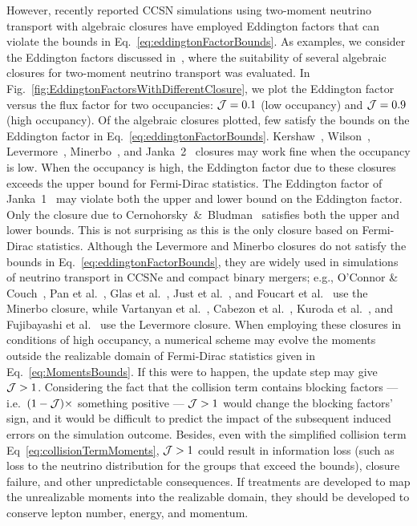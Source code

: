 However, recently reported CCSN simulations using two-moment neutrino transport with algebraic closures have employed Eddington factors that can violate the bounds in Eq.~\eqref{eq:eddingtonFactorBounds}.  
As examples, we consider the Eddington factors discussed in~\cite{murchikova_etal_2017}, where the suitability of several algebraic closures for two-moment neutrino transport was evaluated.  
In Fig.~\ref{fig:EddingtonFactorsWithDifferentClosure}, we plot the Eddington factor versus the flux factor for two occupancies: $\mathcal{J} = 0.1$ (low occupancy) and $\mathcal{J} = 0.9$ (high occupancy).  
Of the algebraic closures plotted, few satisfy the bounds on the Eddington factor in Eq.~\eqref{eq:eddingtonFactorBounds}.  
Kershaw~\cite{kershaw_1976}, Wilson~\cite{wilson_1975,leblancWilson_1970}, Levermore~\cite{levermore_1984}, Minerbo~\cite{minerbo_1978}, and Janka~2~\cite{janka_1992} closures may work fine when the occupancy is low.  
When the occupancy is high, the Eddington factor due to these closures exceeds the upper bound for Fermi-Dirac statistics.  
The Eddington factor of Janka~1~\cite{janka_1991} may violate both the upper and lower bound on the Eddington factor.  
Only the closure due to Cernohorsky~\&~Bludman~\cite{cernohorskyBludman_1994} satisfies both the upper and lower bounds.  
This is not surprising as this is the only closure based on Fermi-Dirac statistics.  
Although the Levermore and Minerbo closures do not satisfy the bounds in Eq.~\eqref{eq:eddingtonFactorBounds}, they are widely used in simulations of neutrino transport in CCSNe and compact binary mergers; e.g., O'Connor \& Couch~\cite{oConnorCouch_2018}, Pan et al.~\cite{pan_etal_2018}, Glas et al.~\cite{glas_etal_2018}, Just et al.~\cite{just_etal_2018}, and Foucart et al.~\cite{foucart_etal_2015} use the Minerbo closure, while Vartanyan et al.~\cite{vartanyan_etal_2018}, Cabezon et al.~\cite{cabezon_etal_2018}, Kuroda et al.~\cite{kuroda_etal_2016}, and Fujibayashi et al.~\cite{fujibayashi_etal_2017} use the Levermore closure.  
When employing these closures in conditions of high occupancy, a numerical scheme may evolve the moments outside the realizable domain of Fermi-Dirac statistics given in Eq.~\eqref{eq:MomentsBounds}.
If this were to happen, the update step may give $\mathcal{J}>1$.
Considering the fact that the collision term contains blocking factors --- i.e.~$(1-\mathcal{J})\times$ something positive --- $\mathcal{J} > 1$ would change the blocking factors' sign, and it would be difficult to predict the impact of the subsequent induced errors on the simulation outcome.
Besides, even with the simplified collision term Eq~\ref{eq:collisionTermMoments}, $\mathcal{J}>1$ could result in information loss (such as loss to the neutrino distribution for the groups that exceed the bounds), closure failure, and other unpredictable consequences.
If treatments are developed to map the unrealizable moments into the realizable domain, they should be developed to conserve lepton number, energy, and momentum.

